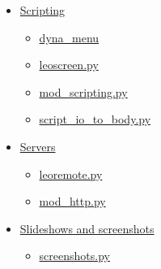 \documentclass[a4paper,10pt,english]{sphinxmanual}
\begin{document}
{\begin{minipage}{0.95\linewidth}
\begin{itemize}
\begin{itemize}
\begin{itemize}
\begin{itemize}
\item {} 
{\hyperref[plugins:multifile-py]{multifile.py}}

\item {} 
{\hyperref[plugins:nicenosent-py]{niceNosent.py}}

\item {} 
{\hyperref[plugins:read-only-nodes-py]{read\_only\_nodes.py}}

\item {} 
{\hyperref[plugins:run-nodes-py]{run\_nodes.py}}

\item {} 
{\hyperref[plugins:startfile-py]{startfile.py}}

\item {} 
{\hyperref[plugins:xsltwithnodes-py]{xsltWithNodes.py}}

\end{itemize}

\item {} 
{\hyperref[plugins:scripting]{Scripting}}
\begin{itemize}
\item {} 
{\hyperref[plugins:dyna-menu]{dyna\_menu}}

\item {} 
{\hyperref[plugins:leoscreen-py]{leoscreen.py}}

\item {} 
{\hyperref[plugins:mod-scripting-py]{mod\_scripting.py}}

\item {} 
{\hyperref[plugins:script-io-to-body-py]{script\_io\_to\_body.py}}

\end{itemize}

\item {} 
{\hyperref[plugins:servers]{Servers}}
\begin{itemize}
\item {} 
{\hyperref[plugins:leoremote-py]{leoremote.py}}

\item {} 
{\hyperref[plugins:mod-http-py]{mod\_http.py}}

\end{itemize}

\item {} 
{\hyperref[plugins:slideshows-and-screenshots]{Slideshows and screenshots}}
\begin{itemize}
\item {} 
{\hyperref[plugins:screenshots-py]{screenshots.py}}


\end{itemize}
\end{itemize}
\end{itemize}
\end{itemize}
\end{minipage}}
\end{document}
